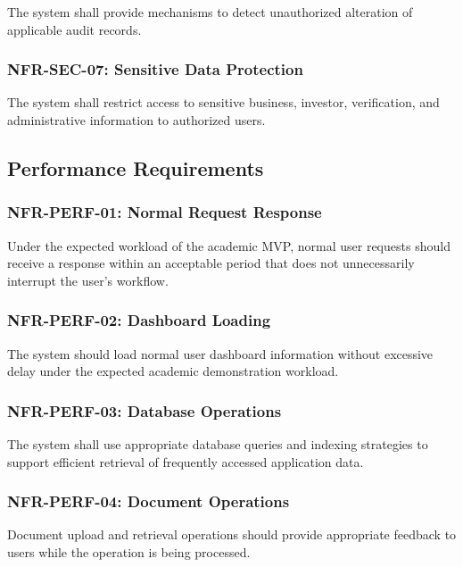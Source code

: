 The system shall provide mechanisms to detect unauthorized alteration of
applicable audit records.

\subsubsection{NFR-SEC-07: Sensitive Data Protection}

The system shall restrict access to sensitive business, investor,
verification, and administrative information to authorized users.



\subsection{Performance Requirements}

\subsubsection{NFR-PERF-01: Normal Request Response}

Under the expected workload of the academic MVP, normal user requests
should receive a response within an acceptable period that does not
unnecessarily interrupt the user's workflow.

\subsubsection{NFR-PERF-02: Dashboard Loading}

The system should load normal user dashboard information without excessive
delay under the expected academic demonstration workload.

\subsubsection{NFR-PERF-03: Database Operations}

The system shall use appropriate database queries and indexing strategies
to support efficient retrieval of frequently accessed application data.

\subsubsection{NFR-PERF-04: Document Operations}

Document upload and retrieval operations should provide appropriate
feedback to users while the operation is being processed.


